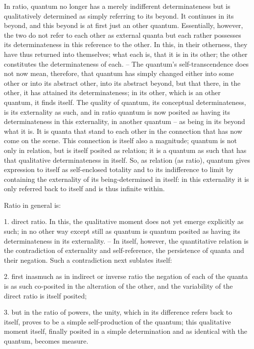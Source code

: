 In ratio, quantum no longer has a merely indifferent determinateness but
is qualitatively determined as simply referring to its beyond. It continues
in its beyond, and this beyond is at first just an other quantum. Essentially,
however, the two do not refer to each other as external quanta but each
rather possesses its determinateness in this reference to the other. In this, in
their otherness, they have thus returned into themselves; what each is,
that it is in its other; the other constitutes the determinateness of each. –
The quantum's self-transcendence does not now mean, therefore, that
quantum has simply changed either into some other or into its abstract
other, into its abstract beyond, but that there, in the other, it has attained
its determinateness; in its other, which is an other quantum, it finds itself.
The quality of quantum, its conceptual determinateness, is its externality
as such, and in ratio quantum is now posited as having its determinateness
in this externality, in another quantum – as being in its beyond what it is.
It is quanta that stand to each other in the connection that has now come
on the scene. This connection is itself also a magnitude; quantum is not only
in relation, but is itself posited as relation; it is a quantum as such that has
that qualitative determinateness in itself. So, as relation (as ratio), quantum
gives expression to itself as self-enclosed totality and to its indifference to
limit by containing the externality of its being-determined in itself: in this
externality it is only referred back to itself and is thus infinite within.

Ratio in general is:

1. direct ratio. In this, the qualitative moment does not yet emerge explicitly
as such; in no other way except still as quantum is quantum posited
as having its determinateness in its externality. – In itself, however, the
quantitative relation is the contradiction of externality and self-reference,
the persistence of quanta and their negation. Such a contradiction next
sublates itself:

2. first inasmuch as in indirect or inverse ratio the negation of each of
the quanta is as such co-posited in the alteration of the other, and the
variability of the direct ratio is itself posited;

3. but in the ratio of powers, the unity, which in its difference refers back
to itself, proves to be a simple self-production of the quantum; this
qualitative moment itself, finally posited in a simple determination and
as identical with the quantum, becomes measure.

